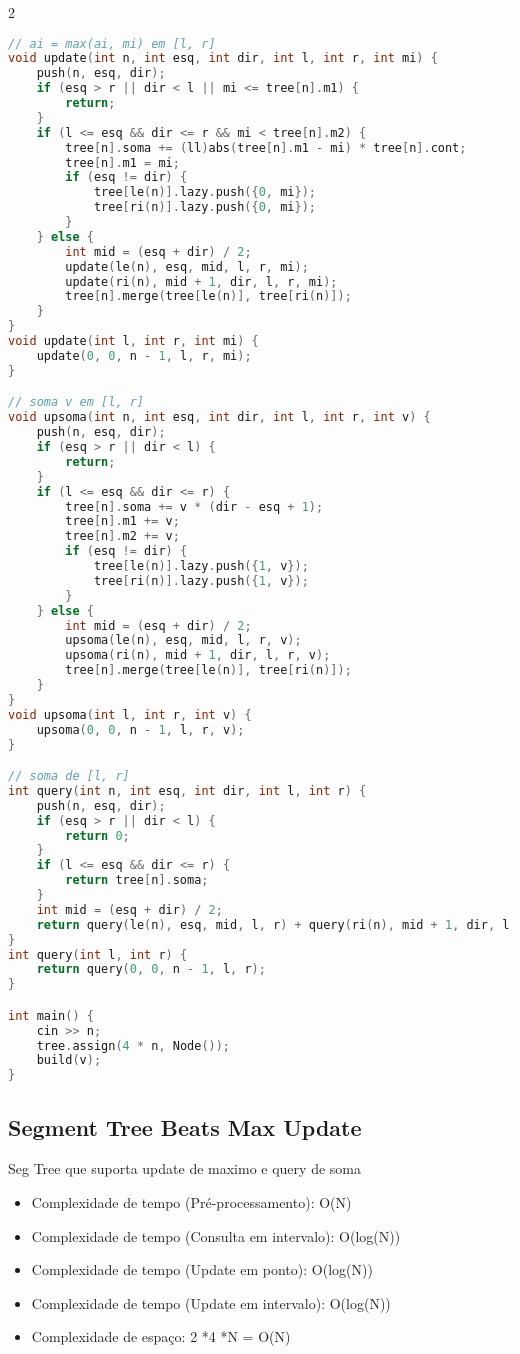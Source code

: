 \documentclass[11pt, a4paper, oneside]{book}
\begin{document}
\begin{multicols}{2}
\begin{lstlisting}[language=C++]
// ai = max(ai, mi) em [l, r]
void update(int n, int esq, int dir, int l, int r, int mi) {
    push(n, esq, dir);
    if (esq > r || dir < l || mi <= tree[n].m1) {
        return;
    }
    if (l <= esq && dir <= r && mi < tree[n].m2) {
        tree[n].soma += (ll)abs(tree[n].m1 - mi) * tree[n].cont;
        tree[n].m1 = mi;
        if (esq != dir) {
            tree[le(n)].lazy.push({0, mi});
            tree[ri(n)].lazy.push({0, mi});
        }
    } else {
        int mid = (esq + dir) / 2;
        update(le(n), esq, mid, l, r, mi);
        update(ri(n), mid + 1, dir, l, r, mi);
        tree[n].merge(tree[le(n)], tree[ri(n)]);
    }
}
void update(int l, int r, int mi) {
    update(0, 0, n - 1, l, r, mi);
}

// soma v em [l, r]
void upsoma(int n, int esq, int dir, int l, int r, int v) {
    push(n, esq, dir);
    if (esq > r || dir < l) {
        return;
    }
    if (l <= esq && dir <= r) {
        tree[n].soma += v * (dir - esq + 1);
        tree[n].m1 += v;
        tree[n].m2 += v;
        if (esq != dir) {
            tree[le(n)].lazy.push({1, v});
            tree[ri(n)].lazy.push({1, v});
        }
    } else {
        int mid = (esq + dir) / 2;
        upsoma(le(n), esq, mid, l, r, v);
        upsoma(ri(n), mid + 1, dir, l, r, v);
        tree[n].merge(tree[le(n)], tree[ri(n)]);
    }
}
void upsoma(int l, int r, int v) {
    upsoma(0, 0, n - 1, l, r, v);
}

// soma de [l, r]
int query(int n, int esq, int dir, int l, int r) {
    push(n, esq, dir);
    if (esq > r || dir < l) {
        return 0;
    }
    if (l <= esq && dir <= r) {
        return tree[n].soma;
    }
    int mid = (esq + dir) / 2;
    return query(le(n), esq, mid, l, r) + query(ri(n), mid + 1, dir, l, r);
}
int query(int l, int r) {
    return query(0, 0, n - 1, l, r);
}

int main() {
    cin >> n;
    tree.assign(4 * n, Node());
    build(v);
}
\end{lstlisting}
\end{multicols}

\hfill

\subsection{Segment Tree Beats Max Update}
Seg Tree que suporta update de maximo e query de soma



\begin{itemize}
\item Complexidade de tempo (Pré-processamento): O(N)
\item Complexidade de tempo (Consulta em intervalo): O(log(N))
\item Complexidade de tempo (Update em ponto): O(log(N))
\item Complexidade de tempo (Update em intervalo): O(log(N))
\item Complexidade de espaço: 2 *4 *N = O(N)
\end{itemize}
\end{document}
